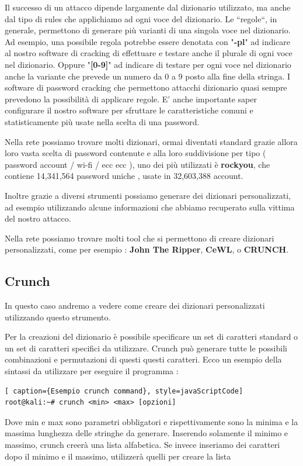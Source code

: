 Il successo di un attacco dipende largamente dal dizionario utilizzato, ma anche dal tipo di rules che applichiamo ad ogni voce del dizionario. Le “regole“, in generale, permettono di generare più varianti di una singola voce nel dizionario. Ad esempio, una possibile regola potrebbe essere denotata con "\textbf{-pl}" ad indicare al nostro software di cracking di effettuare e testare anche il plurale di ogni voce nel dizionario. Oppure "\textbf{[0-9]}" ad indicare di testare per ogni voce nel dizionario anche la variante che prevede un numero da 0 a 9 posto alla fine della stringa. I software di password cracking che permettono attacchi dizionario quasi sempre prevedono la possibilità di applicare regole. E’ anche importante saper configurare il nostro software per sfruttare le caratteristiche comuni e statisticamente più usate nella scelta di una password.

Nella rete possiamo trovare molti dizionari, ormai diventati standard grazie allora loro vasta scelta di password contenute e alla loro suddivisione per tipo ( password account / wi-fi / ecc ecc ), uno dei più utilizzati è \textbf{rockyou}, che contiene 14,341,564 password uniche , usate in 32,603,388 account.

Inoltre grazie a diversi strumenti possiamo generare dei dizionari personalizzati, ad esempio utilizzando alcune informazioni che abbiamo recuperato sulla vittima del nostro attacco.

Nella rete possiamo trovare molti tool che si permettono di creare dizionari personalizzati, come per esempio : \textbf{John The Ripper}, \textbf{CeWL}, \textbf{} o \textbf{CRUNCH}\cite{CRUNCH}.

\subsection{Crunch \cite{CRUNCH}}

In questo caso andremo a vedere come creare dei dizionari personalizzati utilizzando questo strumento. 

Per la creazioni del dizionario è possibile specificare un set di caratteri standard o un set di caratteri specifici da utilizzare. Crunch può generare tutte le possibili combinazioni e permutazioni di questi questi caratteri. Ecco un esempio della sintassi da utilizzare per eseguire il programma :

\begin{lstlisting}[ caption={Esempio crunch command}, style=javaScriptCode]
root@kali:~# crunch <min> <max> [opzioni]
\end{lstlisting}
Dove min e max sono parametri obbligatori e rispettivamente sono la minima e la massima lunghezza delle stringhe da generare.
Inserendo solamente il minimo e massimo, crunch creerà una lista alfabetica.
Se invece inseriamo dei caratteri dopo il minimo e il massimo, utilizzerà quelli per creare la lista


